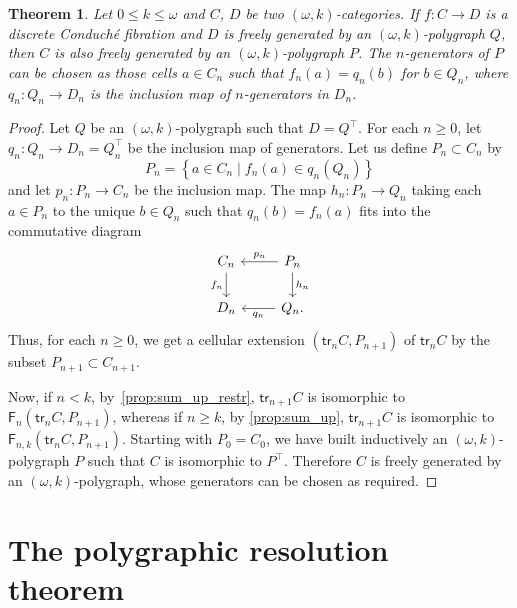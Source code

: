 \documentclass[reqno]{amsart}
\theoremstyle{plain}
\newtheorem{theorem}[subsubsection]{Theorem}
\theoremstyle{definition}
\theoremstyle{remark}
\newcommand{\setof}[2]{\left\{ #1\; | \; #2\right\}}
\newcommand{\pair}[2]{(#1,#2)}       %
\newcommand{\functor}[1]{\mathsf{#1}} %
\newcommand{\trk}[1]{\functor{tr}_{#1}}%
\newcommand{\frf}[1]{\functor{F}_{#1}} %
\newcommand{\frgp}[1]{#1^\top} %
\newcommand{\oo}{\ensuremath{\omega}}
\newcommand{\ook}[1]{\ensuremath{\pair{\omega}{#1}}}
\newcommand{\clx}[2]{\pair{#1}{#2}}%
\begin{document}
\begin{theorem}\label{thm:main}
  Let $0 \leq k\leq \oo$ and $C$, $D$ be two \ook k-categories. If $f:C\to
  D$ is a discrete Conduché fibration and $D$ is freely generated by an
  \ook k-polygraph $Q$, then
$C$ is also freely generated by an \ook k-polygraph $P$. The
$n$-generators of $P$ can be chosen as those cells $a\in C_n$ such that
$f_n(a)=q_n(b)$ for $b\in Q_n$, where $q_n:Q_n\to D_n$ is the inclusion map
of $n$-generators in $D_n$.
\end{theorem}
\begin{proof}
  Let $Q$ be an \ook{k}-polygraph such that
  $D=\frgp Q$. For each $n\geq 0$, let $q_n:Q_n\to D_n=\frgp Q_n$ be the
  inclusion map of generators. Let us define $P_n\subset C_n$ by
  \[
    P_n=\setof{a\in C_n}{f_n(a)\in q_n (Q_n)}
  \]
  and let $p_n:P_n\to C_n$ be the inclusion map. The map
  $h_n:P_n\to Q_n$ taking each $a\in P_n$ to the unique $b\in Q_n$
  such that $q_n(b)=f_n(a)$ fits into the commutative diagram
  \[
    \begin{tikzcd}
      C_n \ar[d,"f_n"'] & P_n \ar[l,"p_n"'] \ar[d,"h_n"]\\
      D_n & Q_n. \ar[l,"q_n"]
    \end{tikzcd}
\]
  Thus, for each
  $n\geq 0$, we get a cellular extension $\clx{\trk nC}{P_{n+1}}$ of
  $\trk n C$ by the subset $P_{n+1}\subset C_{n+1}$.

  Now, if $n<k$,
  by~\cref{prop:sum_up_restr}, $\trk{n+1}C$ is isomorphic to $\frf
  n\clx{\trk nC}{P_{n+1}}$, whereas if $n\geq k$, by
\cref{prop:sum_up},
  $\trk{n+1}C$ is isomorphic to $\frf
  {n,k}\clx{\trk nC}{P_{n+1}}$. Starting with $P_0=C_0$, we have built
  inductively an \ook k-polygraph
  $P$ such that $C$ is isomorphic to $\frgp P$. Therefore $C$ is
  freely generated by an \ook k-polygraph, whose generators can be
  chosen as required.
\end{proof}
\section{The polygraphic resolution theorem}\label{sec:projresol}
\end{document}
